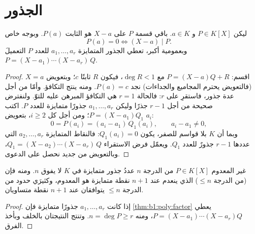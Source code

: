\section{الجذور}

\begin{theorem}\label{thm:b1:poly:factor}
ليكن $P \in K[X]$ و $a \in K$. باقي قسمة $P$ على
$X - a$ هو الثابت $P(a)$. وبوجه خاص
\[
P(a) = 0 \iff (X - a) \mid P .
\]
وبعمومية أكبر، تعطي الجذور المتمايزة $a_1, \dots, a_r$ للعدد $P$
التعميلَ $P = (X - a_1)\cdots(X - a_r)\, Q$.
\end{theorem}

\begin{proof}
اقسم: $P = (X - a) Q + R$ مع $\deg R < 1$، فيكون $R$ ثابتًا
$c$؛ وبتعويض $X = a$ (فالتعويض يحترم المجاميع والجداءات)
نجد $P(a) = c$. ومنه ينتج التكافؤ. وأمّا من أجل عدة جذور،
فاستقرِ على $r$: فالحالة $r = 1$ هي التكافؤ المبرهن عليه للتوّ.
ولنفترض  صحيحة من أجل $r - 1$ جذرًا وليكن $a_1, \dots, a_r$
جذورًا متمايزة للعدد $P$. اكتب $P = (X - a_1)Q_1$؛ ومن أجل كل $i
\geq 2$، بتعويض $a_i$:
\[
0 = P(a_i) = (a_i - a_1)\,Q_1(a_i),
\qquad a_i - a_1 \neq 0 ,
\]
وبما أن $K$ بلا قواسم للصفر، يكون $Q_1(a_i) = 0$: فالنقاط
المتمايزة $a_2, \dots, a_r$ التي عددها $r - 1$ جذورٌ للعدد $Q_1$. ويعمّل
فرض الاستقراء $Q_1 = (X - a_2)\cdots(X - a_r)\,Q$،
وبالتعويض من جديد نحصل على الدعوى.
\end{proof}

\begin{corollary}\label{cor:b1:poly:nroots}
 غير المعدوم $P \in K[X]$ من الدرجة $n$ عددُ جذور متمايزة
في $K$ لا يفوق $n$. ومنه فإن  (من الدرجة $\leq n$) الذي ينعدم عند
$n + 1$ نقطة متمايزة هو  المعدوم، وكثيرَي حدود
من الدرجة $\leq n$ يتوافقان عند $n+1$ نقطة متساويان.
\end{corollary}

\begin{proof}
إذا كانت $a_1, \dots, a_r$ جذورًا متمايزة فإن \cref{thm:b1:poly:factor}
يعطي $P = (X-a_1)\cdots(X-a_r) Q$، ومنه $n = \deg P \geq r$. وتنتج النتيجتان
بالخلف وبأخذ الفرق.
\end{proof}

